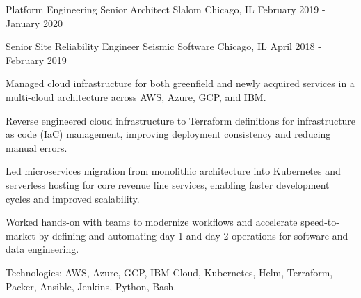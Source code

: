 \begin{cventries}
  \cventry
    {Platform Engineering Senior Architect} %
    {Slalom} %
    {Chicago, IL} %
    {February 2019 - January 2020} %
    {
      \begin{cvitems} %
      \end{cvitems}
    }

  \cventry
    {Senior Site Reliability Engineer} %
    {Seismic Software} %
    {Chicago, IL} %
    {April 2018 - February 2019} %
    {
      \begin{cvitems} %
        \item {Managed cloud infrastructure for both greenfield and newly acquired services in a multi-cloud architecture across AWS, Azure, GCP, and IBM.}
        \item {Reverse engineered cloud infrastructure to Terraform definitions for infrastructure as code (IaC) management, improving deployment consistency and reducing manual errors.}
        \item {Led microservices migration from monolithic architecture into Kubernetes and serverless hosting for core revenue line services, enabling faster development cycles and improved scalability.}
        \item {Worked hands-on with teams to modernize workflows and accelerate speed-to-market by defining and automating day 1 and day 2 operations for software and data engineering.}
        \item {Technologies: AWS, Azure, GCP, IBM Cloud, Kubernetes, Helm, Terraform, Packer, Ansible, Jenkins, Python, Bash.}
      \end{cvitems}
    }


\end{cventries}
